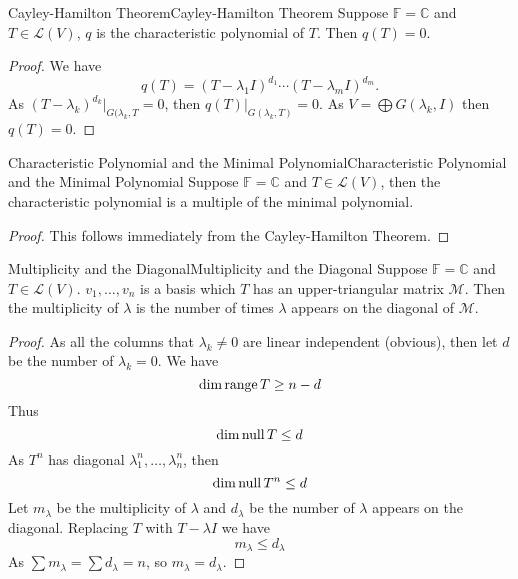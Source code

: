 \documentclass[../main.tex]{subfiles}
\begin{document}
\begin{theorem}{Cayley-Hamilton Theorem}{Cayley-Hamilton Theorem}
Suppose $\mathbb{F}=\mathbb{C}$ and $T\in \mathscr{L}(V)$, $q$ is the characteristic polynomial of $T$. Then $q(T)=0$.
\end{theorem}
\begin{proof}
We have
\begin{equation*}
q(T) = (T-\lambda_1I)^{d_1}\cdots (T-\lambda_mI)^{d_m}.
\end{equation*}
As $(T-\lambda_k)^{d_k}|_{G(\lambda_k,T} = 0$, then $q(T)|_{G(\lambda_k,T)}=0$. As $V = \bigoplus G(\lambda_k,I)$ then $q(T) = 0$.
\end{proof}

\begin{proposition}{Characteristic Polynomial and the Minimal Polynomial}{Characteristic Polynomial and the Minimal Polynomial}
Suppose $\mathbb{F}=\mathbb{C}$ and $T\in \mathscr{L}(V)$, then the characteristic polynomial is a multiple of the minimal polynomial.
\end{proposition}
\begin{proof}
This follows immediately from the Cayley-Hamilton Theorem.
\end{proof}

\begin{theorem}{Multiplicity and the Diagonal}{Multiplicity and the Diagonal}
Suppose $\mathbb{F}=\mathbb{C}$ and $T\in \mathscr{L}(V)$. $v_1, \ldots ,v_n$ is a basis which $T$ has an upper-triangular matrix $\mathscr{M}$. Then the multiplicity of $\lambda$ is the number of times $\lambda$ appears on the diagonal of $\mathscr{M}$.
\end{theorem}
\begin{proof}
As all the columns that $\lambda_k\neq 0$ are linear independent (obvious), then let $d$ be the number of $\lambda_k=0$. We have
\begin{equation*}
\dim \operatorname{range} T \geq n-d
\end{equation*}
Thus
\begin{equation*}
\dim \operatorname{null} T \leq d
\end{equation*}
As $T^n$ has diagonal $\lambda_1^n, \ldots ,\lambda_n^n$, then
\begin{equation*}
\dim \operatorname{null} T^n \leq d
\end{equation*}
Let $m_{\lambda}$ be the multiplicity of $\lambda$ and $d_{\lambda}$ be the number of $\lambda$ appears on the diagonal. Replacing $T$ with $T-\lambda I$ we have
\begin{equation*}
m_{\lambda} \leq d_{\lambda}
\end{equation*}
As $\sum m_{\lambda} = \sum d_{\lambda} = n$, so $m_{\lambda} = d_{\lambda}$.
\end{proof}
\end{document}
